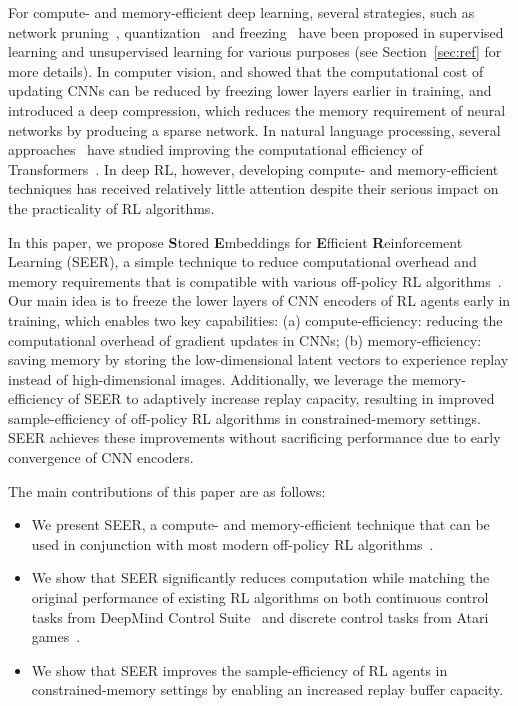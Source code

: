 \documentclass{article}
\begin{document}
For compute- and memory-efficient deep learning, 
several strategies, such as network pruning~\citep{han2015deep, frankle2018lottery}, quantization~\citep{han2015deep,iandola2016squeezenet} and freezing~\citep{yosinski2014transferable,46337} 
have been proposed in supervised learning and unsupervised learning for various purposes (see Section~\ref{sec:ref} for more details).
In computer vision, 
\citet{46337} and \citet{brock2017freezeout} showed that the computational cost of updating CNNs can be reduced by freezing lower layers earlier in training, and \citet{han2015deep} introduced a deep compression, which reduces the memory requirement of neural networks by producing a sparse network.
In natural language processing,
several approaches~\citep{tay2019lightweight,sun2020mobilebert} have studied improving the computational efficiency of Transformers~\citep{vaswani2017attention}.
In deep RL, however, developing compute- and memory-efficient techniques has received relatively little attention despite their serious impact on the practicality of RL algorithms.

In this paper, we propose {\bf S}tored {\bf E}mbeddings for {\bf E}fficient {\bf R}einforcement Learning (SEER),
a simple technique to reduce computational overhead and memory requirements that is compatible with various off-policy RL algorithms~\citep{haarnoja2018soft,hessel2018rainbow,srinivas2020curl}.
Our main idea is to freeze the lower layers of CNN encoders of RL agents early in training, which enables two key capabilities: 
(a) compute-efficiency: reducing the computational overhead of gradient updates in CNNs; 
(b) memory-efficiency: saving memory by storing the low-dimensional latent vectors to experience replay instead of high-dimensional images. Additionally, we leverage the memory-efficiency of SEER to adaptively increase replay capacity, resulting in improved sample-efficiency of off-policy RL algorithms in constrained-memory settings. SEER achieves these improvements without sacrificing performance due to early convergence of CNN encoders. 

The main contributions of this paper are as follows:
\begin{itemize} [leftmargin=5.5mm]
    \item We present SEER, a compute- and memory-efficient technique that can be used in conjunction with most modern off-policy RL algorithms~\citep{haarnoja2018soft,hessel2018rainbow}.
    \item We show that SEER significantly reduces computation while matching the original performance of existing RL algorithms on both continuous control tasks from DeepMind Control Suite~\citep{tassa2018deepmind} and discrete control tasks from Atari games~\citep{bellemare2013arcade}.
    \item We show that SEER improves the sample-efficiency of RL agents in constrained-memory settings by enabling an increased replay buffer capacity.
\end{itemize}
\end{document}
